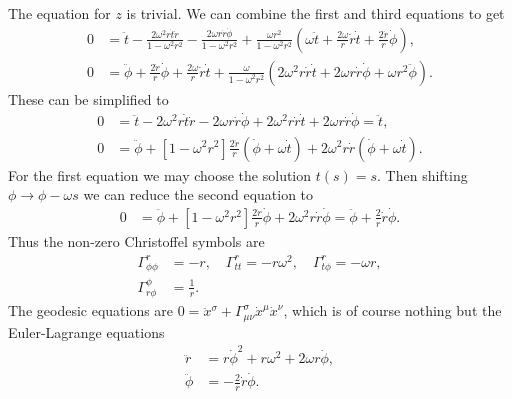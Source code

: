 \documentclass[english, parskip=full]{scrartcl}
\newcommand{\intx}{}
\newcommand{\kla}{}
\newcommand{\klam}{}
\newcommand{\tecxt}{}
\begin{document}
The equation for $z$ is trivial.
We can combine the first and third equations to get
\begin{align}
0 &= \ddot{t} - \frac{2\omega^2r \dot{t}\dot{r}}{1 - \omega^2r^2} - \frac{2\omega r\dot{r}\dot{\phi}}{1 - \omega^2r^2} + \frac{\omega r^2}{1 - \omega^2r^2} \kla\left( \omega \ddot{t} + \frac{2\omega}{r}\dot{r}\dot{t} + \frac{2\dot{r}}{r}\dot{\phi} \right),\\
0 &= \ddot{\phi} + \frac{2\dot{r}}{r}\dot{\phi} + \frac{2\omega}{r} \dot{r}\dot{t} + \frac{\omega}{1 - \omega^2r^2} \kla\left( 2\omega^2 r\dot{r}\dot{t} + 2\omega r\dot{r}\dot{\phi} + \omega r^2 \ddot{\phi} \right).
\end{align}
These can be simplified to
\begin{align}
0 &= \ddot{t} - 2\omega^2 r\dot{t}\dot{r} - 2\omega r\dot{r}\dot{\phi} + 2\omega^2 r\dot{r}\dot{t} + 2\omega r\dot{r}\dot{\phi} = \ddot{t},\\
0 &= \ddot{\phi} + \klam\left[ 1 - \omega^2r^2 \right] \frac{2\dot{r}}{r} \kla\left( \dot{\phi} + \omega\dot{t} \right) + 2\omega^2 r\dot{r} \kla\left( \dot{\phi} + \omega\dot{t} \right).
\end{align}
For the first equation we may choose the solution $t(s) = s$.
Then shifting $\phi \rightarrow \phi - \omega s$ we can reduce the second equation to
\begin{align}
0 &= \ddot{\phi} + \klam\left[ 1 - \omega^2r^2 \right] \frac{2\dot{r}}{r} \dot{\phi} + 2\omega^2 r\dot{r}\dot{\phi} = \ddot{\phi} + \frac{2}{r} \dot{r}\dot{\phi}.
\end{align}
Thus the non-zero Christoffel symbols are
\begin{align} 
\Gamma^r_{\phi\phi} &= -r, \quad \Gamma^r_{tt} = -r\omega^2, \quad \Gamma^r_{t\phi} = - \omega r,\\
\Gamma^\phi_{r\phi} &= \frac{1}{r}.
\end{align}
The geodesic equations are $0 = \ddot{x}^\sigma + \Gamma^\sigma_{\mu\nu} \dot{x}^\mu \dot{x}^\nu$, which is of course nothing but the Euler-Lagrange equations
\begin{align}
\ddot{r} &= r\dot{\phi}^2 + r\omega^2 + 2\omega r \dot{\phi},\\
\ddot{\phi} &= -\frac{2}{r}\dot{r}\dot{\phi}.
\end{align}
\end{document}
